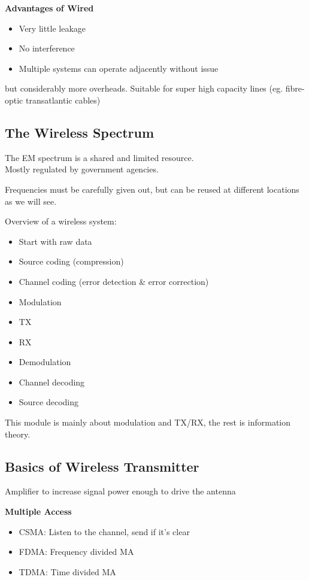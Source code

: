 \documentclass[12pt]{article}
\begin{document}
\textbf{Advantages of Wired}

\begin{itemize}[noitemsep]
    \item Very little leakage
    \item No interference
    \item Multiple systems can operate adjacently without issue
\end{itemize}
but considerably more overheads.
Suitable for super high capacity lines (eg. fibre-optic transatlantic cables)

\subsection{The Wireless Spectrum}
The EM spectrum is a shared and limited resource.\\
Mostly regulated by government agencies.

Frequencies must be carefully given out, but can be reused at different locations as we will see.

Overview of a wireless system:
\begin{itemize}[noitemsep]
\item Start with raw data
\item Source coding (compression)
\item Channel coding (error detection \& error correction)
\item Modulation
\item TX
\item RX
\item Demodulation
\item Channel decoding
\item Source decoding
\end{itemize}

This module is mainly about modulation and TX/RX, the rest is information theory.

\subsection{Basics of Wireless Transmitter}
Amplifier to increase signal power enough to drive the antenna

\textbf{Multiple Access}
\begin{itemize}[noitemsep]
\item CSMA: Listen to the channel, send if it's clear
\item FDMA: Frequency divided MA
\item TDMA: Time divided MA
\end{itemize}
\end{document}
